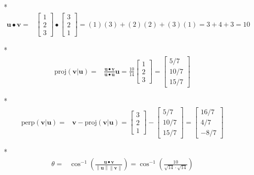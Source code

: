\documentclass{article}
\begin{document}
\begin{itemize}
\begin{align*}
\end{align*}
\item[*] \begin{align*}
\mathbf{u} \bullet \mathbf{v} = & \begin{bmatrix} 1 \\ 2 \\ 3 \end{bmatrix} \bullet \begin{bmatrix} 3 \\ 2 \\ 1 \end{bmatrix} 
= (1)(3) + (2)(2) + (3)(1) 
= 3 + 4 + 3
= 10  
\end{align*}
\item[*] \begin{align*}
\text{proj}(\mathbf{v} | \mathbf{u}) = & \frac{\mathbf{u} \bullet \mathbf{v}}{\mathbf{u} \bullet \mathbf{u}}\mathbf{u}
= \frac{10}{14}\begin{bmatrix} 1 \\ 2 \\ 3 \end{bmatrix} 
= \begin{bmatrix} 5/7 \\ 10/7 \\ 15/7 \end{bmatrix}
\end{align*}
\item[*] \begin{align*}
\text{perp}(\mathbf{v} | \mathbf{u}) = & \mathbf{v} - \text{proj}(\mathbf{v} | \mathbf{u})
= \begin{bmatrix} 3 \\ 2 \\ 1 \end{bmatrix} - \begin{bmatrix} 5/7 \\ 10/7 \\ 15/7 \end{bmatrix} 
= \begin{bmatrix} 16/7 \\ 4/7 \\ -8/7 \end{bmatrix}
\end{align*}
\item[*] \begin{align*}
\theta = & \cos^{-1}\left(\frac{\mathbf{u} \bullet \mathbf{v}}{\left\|\mathbf{u}\right\| \left\|\mathbf{v}\right\|}\right)  
= \cos^{-1}\left(\frac{10}{\sqrt{14} \cdot \sqrt{14}}\right) 

\end{align*}
\end{itemize}
\end{document}
